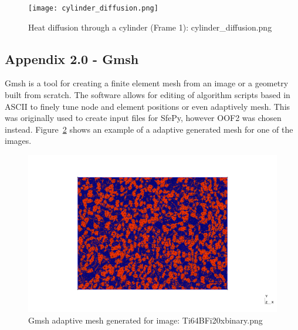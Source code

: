 \documentclass[\report.tex]{subfiles}
\begin{document}
\begin{figure}[H]
    \centering
    \texttt{[image: cylinder\_diffusion.png]}
    \caption{Heat diffusion through a cylinder (Frame 1): cylinder\_diffusion.png}
    \label{fig:sfepy_example}
\end{figure}


\subsection{Appendix 2.0 - Gmsh}
\noindent Gmsh is a tool for creating a finite element mesh from an image or a geometry built from scratch. The software allows for editing of algorithm scripts based in ASCII to finely tune node and element positions or even adaptively mesh. This was originally used to create input files for SfePy, however OOF2 was chosen instead. Figure~\ref{fig:gmsh} shows an example of a adaptive generated mesh for one of the images.

\begin{figure}[H]
    \centering
    \includegraphics[width=14cm]{Images/out.png}
    \caption{Gmsh adaptive mesh generated for image: Ti64BFi20xbinary.png}
    \label{fig:gmsh}
\end{figure}
\end{document}
